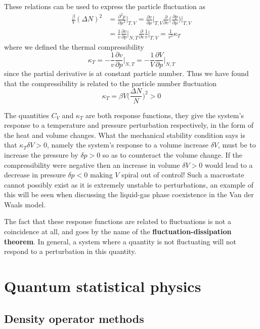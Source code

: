 \documentclass[a4paper,11pt,oneside]{book}
\begin{document}
These relations can be used to express the particle fluctuation as
\begin{align}
    \frac{\beta}{V}(\Delta N)^2 &=\frac{\partial^2 p}{\partial \mu^2}\bigg|_{T,V} = \frac{\partial v}{\partial \mu}\bigg|_{T,V} \frac{\partial}{\partial v}\bigg(\frac{\partial p}{\partial \mu}\bigg)\bigg|_{T,V}\\
    &=\frac{1}{v}\frac{\partial v}{\partial p}\bigg|_{N,T}\frac{\partial}{\partial v}\frac{1}{v}\bigg|_{T,V}=\frac{1}{v^2} \kappa_T
\end{align}
where we defined the thermal compressibility
\begin{equation}
    \kappa_T =  -\frac{1}{v}\frac{\partial v}{\partial p}\bigg|_{N,T} = -\frac{1}{V}\frac{\partial V}{\partial p}\bigg|_{N,T} 
\end{equation}
since the partial derivative is at constant particle number. Thus we have found that the compressibility is related to the particle number fluctuation
\begin{equation}
    \boxed{\kappa_T = \beta V \bigg(\frac{\Delta N}{N}\bigg)^2 >0}
\end{equation}

The quantities $C_V$ and $\kappa_T$ are both response functions, they give the system's response to a temperature and pressure perturbation respectively, in the form of the heat and volume changes. What the mechanical stability condition says is that $\kappa_T \delta V>0$, namely the system's response to a volume increase $\delta V$, must be to increase the pressure by $\delta p>0$ so as to counteract the volume change. If the compressibility were negative then an increase in volume $\delta V>0$ would lead to a decrease in pressure $\delta p<0$ making $V$ spiral out of control! Such a macrostate cannot possibly exist as it is extremely unstable to perturbations, an example of this will be seen when discussing the liquid-gas phase coexistence in the Van der Waals model.

The fact that these response functions are related to fluctuations is not a coincidence at all, and goes by the name of the \textbf{fluctuation-dissipation theorem}. In general, a system where a quantity is not fluctuating will not respond to a perturbation in this quantity.
\part{Quantum statistical physics}
\chapter{Density operator methods}
\end{document}
